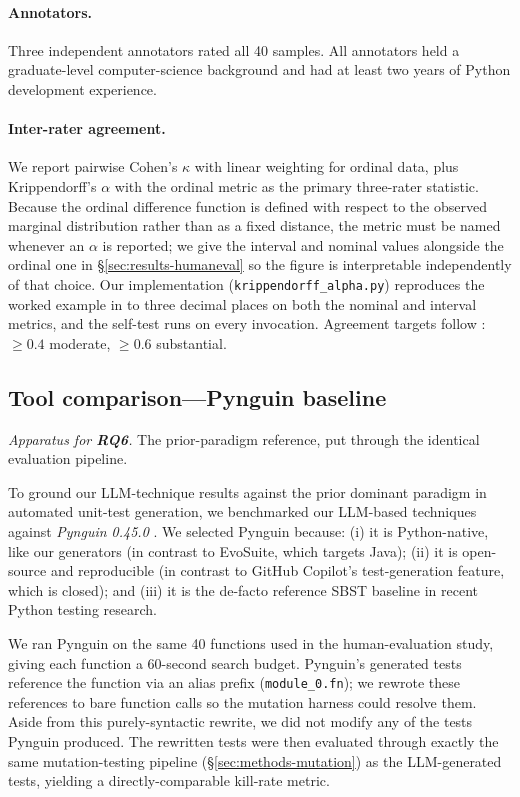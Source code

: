 \documentclass[smallextended]{svjour3}
\begin{document}
\paragraph{Annotators.}
Three independent annotators rated all 40 samples. All annotators
held a graduate-level computer-science background and had at least
two years of Python development experience.

\paragraph{Inter-rater agreement.}
We report pairwise Cohen's $\kappa$ with linear weighting for
ordinal data, plus Krippendorff's $\alpha$ with the ordinal metric as
the primary three-rater statistic. Because the ordinal difference
function is defined with respect to the observed marginal
distribution rather than as a fixed distance, the metric must be
named whenever an $\alpha$ is reported; we give the interval and
nominal values alongside the ordinal one in
\S\ref{sec:results-humaneval} so the figure is interpretable
independently of that choice. Our implementation
(\texttt{krippendorff\_alpha.py}) reproduces the worked example in
\citet{krippendorff2018} to three decimal places on both the nominal
and interval metrics, and the self-test runs on every invocation.
Agreement targets follow \citet{landis1977}: $\geq 0.4$ moderate,
$\geq 0.6$ substantial.

\subsection{Tool comparison---Pynguin baseline}\label{sec:methods-pynguin}

\emph{Apparatus for \textbf{RQ6}.} The prior-paradigm reference, put through
the identical evaluation pipeline.


To ground our LLM-technique results against the prior dominant paradigm
in automated unit-test generation, we benchmarked our LLM-based
techniques against \emph{Pynguin 0.45.0} \citep{lukasczyk2022}. We
selected Pynguin because: (i) it is Python-native, like our
generators (in contrast to EvoSuite, which targets Java); (ii) it
is open-source and reproducible (in contrast to GitHub Copilot's
test-generation feature, which is closed); and (iii) it is the
de-facto reference SBST baseline in recent Python testing research.

We ran Pynguin on the same 40 functions used in the human-evaluation
study, giving each function a 60-second search budget. Pynguin's
generated tests reference the function via an alias prefix
(\texttt{module\_0.fn}); we rewrote these references to bare
function calls so the mutation harness could resolve them. Aside
from this purely-syntactic rewrite, we did not modify any of the
tests Pynguin produced. The rewritten tests were then evaluated
through exactly the same mutation-testing pipeline
(\S\ref{sec:methods-mutation}) as the LLM-generated tests, yielding
a directly-comparable kill-rate metric.
\end{document}
